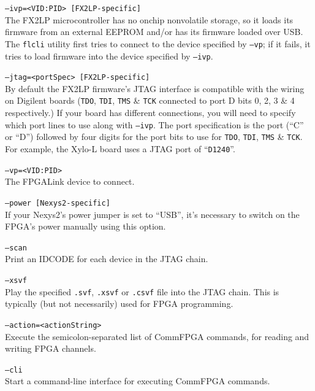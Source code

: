 
\begin{desc}
  \item[\texttt{--ivp=<VID:PID> [FX2LP-specific]}] \hfill \\
    The FX2LP microcontroller has no onchip nonvolatile storage, so it loads its firmware from an external EEPROM and/or has its firmware loaded over USB. The \texttt{flcli} utility first tries to connect to the device specified by \texttt{--vp}; if it fails, it tries to load firmware into the device specified by \texttt{--ivp}.
  \item[\texttt{--jtag=<portSpec> [FX2LP-specific]}] \hfill \\
    By default the FX2LP firmware's JTAG interface is compatible with the wiring on Digilent boards (\texttt{TDO}, \texttt{TDI}, \texttt{TMS} \& \texttt{TCK} connected to port D bits 0, 2, 3 \& 4 respectively.) If your board has different connections, you will need to specify which port lines to use along with \texttt{--ivp}. The port specification is the port (``C'' or ``D'') followed by four digits for the port bits to use for \texttt{TDO}, \texttt{TDI}, \texttt{TMS} \& \texttt{TCK}. For example, the Xylo-L board uses a JTAG port of ``\texttt{D1240}''.
  \item[\texttt{--vp=<VID:PID>}] \hfill \\
    The FPGALink device to connect.
  \item[\texttt{--power [Nexys2-specific]}] \hfill \\
    If your Nexys2's power jumper is set to ``USB'', it's necessary to switch on the FPGA's power manually using this option.
  \item[\texttt{--scan}] \hfill \\
    Print an IDCODE for each device in the JTAG chain.
  \item[\texttt{--xsvf}] \hfill \\
    Play the specified \texttt{.svf}, \texttt{.xsvf} or \texttt{.csvf} file into the JTAG chain. This is typically (but not necessarily) used for FPGA programming.
  \item[\texttt{--action=<actionString>}] \hfill \\
    Execute the semicolon-separated list of CommFPGA commands, for reading and writing FPGA channels.
  \item[\texttt{--cli}] \hfill \\
    Start a command-line interface for executing CommFPGA commands.
\end{desc}

